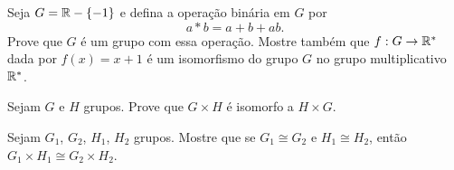 \documentclass[12pt]{exam}
\begin{document}
    \vspace{.3cm}

    \questao{} Seja $G = \mathbb{R} - \{-1\}$ e defina a operação binária em $G$ por
    \[
        a * b = a + b + ab.
    \]
    Prove que $G$ é um grupo com essa operação. Mostre também que $f : G \to \mathbb{R}^*$ dada por $f(x) = x + 1$ é um isomorfismo do grupo $G$ no grupo multiplicativo $\mathbb{R}^*$.

    \vspace{.3cm}

    \questao{} Sejam $G$ e $H$ grupos. Prove que $G \times H$ é isomorfo a $H \times G$.

    \vspace{.3cm}

    \questao{} Sejam $G_1$, $G_2$, $H_1$, $H_2$ grupos. Mostre que se $G_1 \cong G_2$ e $H_1 \cong H_2$, então $G_1 \times H_1 \cong G_2 \times H_2$.
\end{document}
